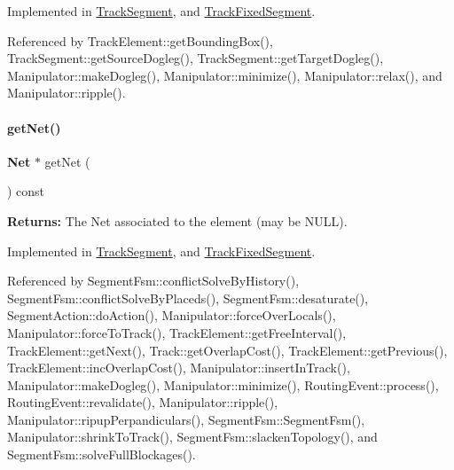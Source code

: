 Implemented in \mbox{\hyperlink{classKite_1_1TrackSegment_a0dd7cf705ace42c662c289955313b2e9}{Track\+Segment}}, and \mbox{\hyperlink{classKite_1_1TrackFixedSegment_a0dd7cf705ace42c662c289955313b2e9}{Track\+Fixed\+Segment}}.



Referenced by Track\+Element\+::get\+Bounding\+Box(), Track\+Segment\+::get\+Source\+Dogleg(), Track\+Segment\+::get\+Target\+Dogleg(), Manipulator\+::make\+Dogleg(), Manipulator\+::minimize(), Manipulator\+::relax(), and Manipulator\+::ripple().

\mbox{\label{classKite_1_1TrackElement_a2b383a5b6f5028911a35e446a682dabd}} 
\paragraph{\texorpdfstring{get\+Net()}{getNet()}}
{\footnotesize\ttfamily \textbf{ Net} $\ast$ get\+Net (\begin{DoxyParamCaption}{ }\end{DoxyParamCaption}) const\hspace{0.3cm}{\ttfamily [pure virtual]}}

{\bfseries Returns\+:} The Net associated to the element (may be {\ttfamily N\+U\+LL}). 

Implemented in \mbox{\hyperlink{classKite_1_1TrackSegment_a692492374623a5c6096b2c4a51190359}{Track\+Segment}}, and \mbox{\hyperlink{classKite_1_1TrackFixedSegment_a692492374623a5c6096b2c4a51190359}{Track\+Fixed\+Segment}}.



Referenced by Segment\+Fsm\+::conflict\+Solve\+By\+History(), Segment\+Fsm\+::conflict\+Solve\+By\+Placeds(), Segment\+Fsm\+::desaturate(), Segment\+Action\+::do\+Action(), Manipulator\+::force\+Over\+Locals(), Manipulator\+::force\+To\+Track(), Track\+Element\+::get\+Free\+Interval(), Track\+Element\+::get\+Next(), Track\+::get\+Overlap\+Cost(), Track\+Element\+::get\+Previous(), Track\+Element\+::inc\+Overlap\+Cost(), Manipulator\+::insert\+In\+Track(), Manipulator\+::make\+Dogleg(), Manipulator\+::minimize(), Routing\+Event\+::process(), Routing\+Event\+::revalidate(), Manipulator\+::ripple(), Manipulator\+::ripup\+Perpandiculars(), Segment\+Fsm\+::\+Segment\+Fsm(), Manipulator\+::shrink\+To\+Track(), Segment\+Fsm\+::slacken\+Topology(), and Segment\+Fsm\+::solve\+Full\+Blockages().

